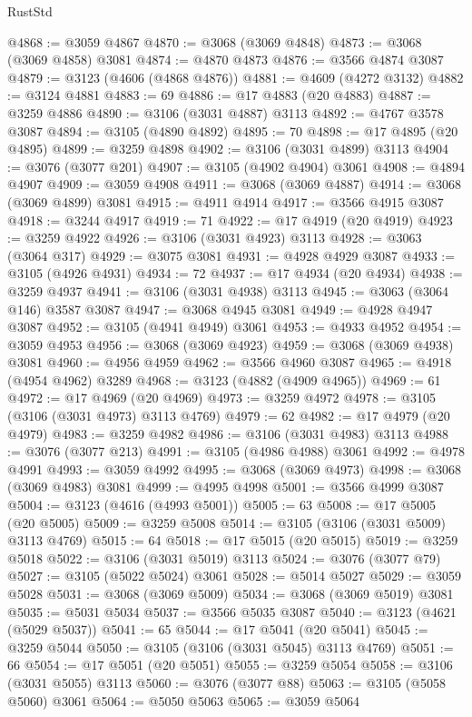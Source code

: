 \begin{lexlean}{RustStd}
\begin{coremodule}
@4868 := @3059 @4867
@4870 := @3068 (@3069 @4848)
@4873 := @3068 (@3069 @4858) @3081
@4874 := @4870 @4873
@4876 := @3566 @4874 @3087
@4879 := @3123 (@4606 (@4868 @4876))
@4881 := @4609 (@4272 @3132)
@4882 := @3124 @4881
@4883 := 69
@4886 := @17 @4883 (@20 @4883)
@4887 := @3259 @4886
@4890 := @3106 (@3031 @4887) @3113
@4892 := @4767 @3578 @3087
@4894 := @3105 (@4890 @4892)
@4895 := 70
@4898 := @17 @4895 (@20 @4895)
@4899 := @3259 @4898
@4902 := @3106 (@3031 @4899) @3113
@4904 := @3076 (@3077 @201)
@4907 := @3105 (@4902 @4904) @3061
@4908 := @4894 @4907
@4909 := @3059 @4908
@4911 := @3068 (@3069 @4887)
@4914 := @3068 (@3069 @4899) @3081
@4915 := @4911 @4914
@4917 := @3566 @4915 @3087
@4918 := @3244 @4917
@4919 := 71
@4922 := @17 @4919 (@20 @4919)
@4923 := @3259 @4922
@4926 := @3106 (@3031 @4923) @3113
@4928 := @3063 (@3064 @317)
@4929 := @3075 @3081
@4931 := @4928 @4929 @3087
@4933 := @3105 (@4926 @4931)
@4934 := 72
@4937 := @17 @4934 (@20 @4934)
@4938 := @3259 @4937
@4941 := @3106 (@3031 @4938) @3113
@4945 := @3063 (@3064 @146) @3587 @3087
@4947 := @3068 @4945 @3081
@4949 := @4928 @4947 @3087
@4952 := @3105 (@4941 @4949) @3061
@4953 := @4933 @4952
@4954 := @3059 @4953
@4956 := @3068 (@3069 @4923)
@4959 := @3068 (@3069 @4938) @3081
@4960 := @4956 @4959
@4962 := @3566 @4960 @3087
@4965 := @4918 (@4954 @4962) @3289
@4968 := @3123 (@4882 (@4909 @4965))
@4969 := 61
@4972 := @17 @4969 (@20 @4969)
@4973 := @3259 @4972
@4978 := @3105 (@3106 (@3031 @4973) @3113 @4769)
@4979 := 62
@4982 := @17 @4979 (@20 @4979)
@4983 := @3259 @4982
@4986 := @3106 (@3031 @4983) @3113
@4988 := @3076 (@3077 @213)
@4991 := @3105 (@4986 @4988) @3061
@4992 := @4978 @4991
@4993 := @3059 @4992
@4995 := @3068 (@3069 @4973)
@4998 := @3068 (@3069 @4983) @3081
@4999 := @4995 @4998
@5001 := @3566 @4999 @3087
@5004 := @3123 (@4616 (@4993 @5001))
@5005 := 63
@5008 := @17 @5005 (@20 @5005)
@5009 := @3259 @5008
@5014 := @3105 (@3106 (@3031 @5009) @3113 @4769)
@5015 := 64
@5018 := @17 @5015 (@20 @5015)
@5019 := @3259 @5018
@5022 := @3106 (@3031 @5019) @3113
@5024 := @3076 (@3077 @79)
@5027 := @3105 (@5022 @5024) @3061
@5028 := @5014 @5027
@5029 := @3059 @5028
@5031 := @3068 (@3069 @5009)
@5034 := @3068 (@3069 @5019) @3081
@5035 := @5031 @5034
@5037 := @3566 @5035 @3087
@5040 := @3123 (@4621 (@5029 @5037))
@5041 := 65
@5044 := @17 @5041 (@20 @5041)
@5045 := @3259 @5044
@5050 := @3105 (@3106 (@3031 @5045) @3113 @4769)
@5051 := 66
@5054 := @17 @5051 (@20 @5051)
@5055 := @3259 @5054
@5058 := @3106 (@3031 @5055) @3113
@5060 := @3076 (@3077 @88)
@5063 := @3105 (@5058 @5060) @3061
@5064 := @5050 @5063
@5065 := @3059 @5064

\end{coremodule}
\end{lexlean}
